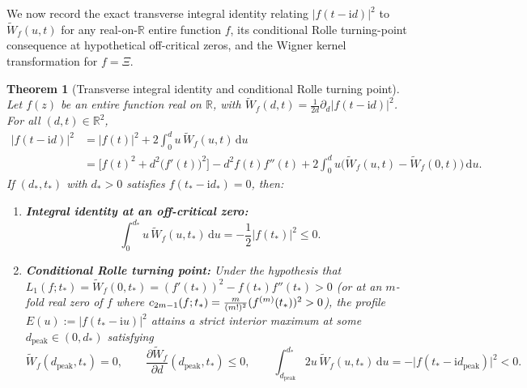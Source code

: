 \documentclass[11pt,a4paper,reqno]{amsart}
\newtheorem{theorem}{Theorem}[section]
\theoremstyle{definition}
\theoremstyle{remark}
\numberwithin{equation}{section}
\newcommand{\dd}{\mathrm{d}}
\newcommand{\ii}{\mathrm{i}}
\newcommand{\Wtil}{\widetilde{W}}
\newcommand{\fac}{\mathclose{\mathchar"0021}}
\begin{document}
We now record the exact transverse integral identity relating $|f(t-\ii d)|^2$ to $\Wtil_f(u,t)$ for any real-on-$\mathbb{R}$ entire function $f$, its conditional Rolle turning-point consequence at hypothetical off-critical zeros, and the Wigner kernel transformation for $f = \Xi$.

\begin{theorem}[Transverse integral identity and conditional Rolle turning point]\label{thm:integral_law_rolle}
Let $f(z)$ be an entire function real on $\mathbb{R}$, with $\Wtil_f(d,t) = \frac{1}{2d}\partial_d|f(t-\ii d)|^2$. For all $(d,t) \in \mathbb{R}^2$,
\begin{equation}\label{eq:boxed_integral_law}
\boxed{\begin{aligned}
\big|f(t - \ii d)\big|^2 &= \big|f(t)\big|^2 + 2\int_0^d u\,\Wtil_f(u,t)\,\dd u \\
&= \Big[f(t)^2 + d^2\big(f'(t)\big)^2\Big] - d^2 f(t)f''(t) + 2\int_0^d u\big(\Wtil_f(u,t) - \Wtil_f(0,t)\big)\,\dd u.
\end{aligned}}
\end{equation}
If $(d_*, t_*)$ with $d_* > 0$ satisfies $f(t_* - \ii d_*) = 0$, then:
\begin{enumerate}
\item[\textup{(a)}] \textbf{Integral identity at an off-critical zero:}
\begin{equation}\label{eq:rolle_integral_cond}
\int_0^{d_*} u\,\Wtil_f(u, t_*)\,\dd u = -\frac{1}{2}\big|f(t_*)\big|^2 \le 0.
\end{equation}
\item[\textup{(b)}] \textbf{Conditional Rolle turning point:} Under the hypothesis that $L_1(f; t_*) = \Wtil_f(0,t_*) = (f'(t_*))^2 - f(t_*)f''(t_*) > 0$ (or at an $m$-fold real zero of $f$ where $c_{2m-1}(f;t_*) = \frac{m}{(m\fac)^2}(f^{(m)}(t_*))^2 > 0$), the profile $E(u) := |f(t_* - \ii u)|^2$ attains a strict interior maximum at some $d_{\mathrm{peak}} \in (0, d_*)$ satisfying
\begin{equation}\label{eq:rolle_peak}
\Wtil_f(d_{\mathrm{peak}}, t_*) = 0, \qquad
\frac{\partial \Wtil_f}{\partial d}(d_{\mathrm{peak}}, t_*) \le 0, \qquad
\int_{d_{\mathrm{peak}}}^{d_*} 2u\,\Wtil_f(u, t_*)\,\dd u = -\big|f(t_* - \ii d_{\mathrm{peak}})\big|^2 < 0.
\end{equation}
\end{enumerate}
\end{theorem}
\end{document}
